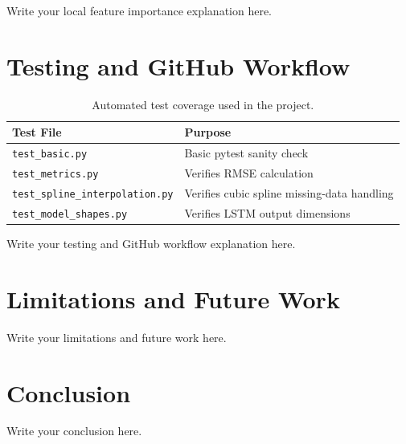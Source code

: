 \documentclass[11pt]{article}
\begin{document}
Write your local feature importance explanation here.

\section{Testing and GitHub Workflow}


\begin{table}[H]
\centering
\begin{tabular}{ll}
\toprule
Test File & Purpose \\
\midrule
\texttt{test\_basic.py} & Basic pytest sanity check \\
\texttt{test\_metrics.py} & Verifies RMSE calculation \\
\texttt{test\_spline\_interpolation.py} & Verifies cubic spline missing-data handling \\
\texttt{test\_model\_shapes.py} & Verifies LSTM output dimensions \\
\bottomrule
\end{tabular}
\caption{Automated test coverage used in the project.}
\label{tab:tests}
\end{table}

Write your testing and GitHub workflow explanation here.

\section{Limitations and Future Work}


Write your limitations and future work here.

\section{Conclusion}


Write your conclusion here.

\end{document}
